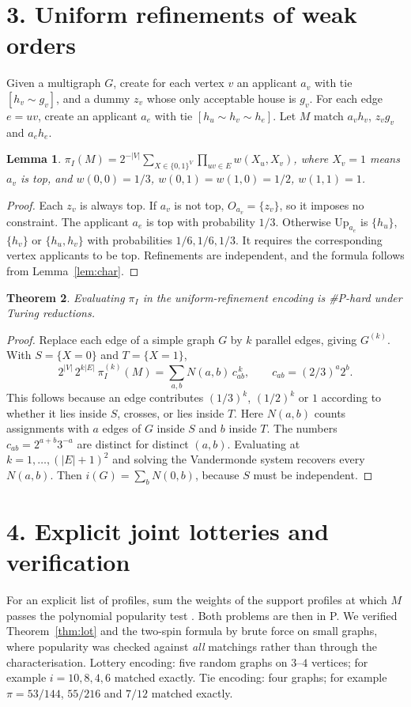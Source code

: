 \documentclass[11pt]{article}
\newtheorem{theorem}{Theorem}
\newtheorem{lemma}[theorem]{Lemma}
\theoremstyle{definition}
\begin{document}
\section*{3. Uniform refinements of weak orders}
Given a multigraph $G$, create for each vertex $v$ an applicant $a_v$ with tie $[h_v\sim g_v]$, and a dummy $z_v$ whose
only acceptable house is $g_v$. For each edge $e=uv$, create an applicant $a_e$ with tie $[h_u\sim h_v\sim h_e]$. Let $M$
match $a_v h_v$, $z_v g_v$ and $a_e h_e$.
\begin{lemma}
$\pi_I(M)=2^{-|V|}\sum_{X\in\{0,1\}^V}\prod_{uv\in E}w(X_u,X_v)$, where $X_v=1$ means $a_v$ is top, and
$w(0,0)=1/3$, $w(0,1)=w(1,0)=1/2$, $w(1,1)=1$.
\end{lemma}
\begin{proof}
Each $z_v$ is always top. If $a_v$ is not top, $O_{a_v}=\{z_v\}$, so it imposes no constraint. The applicant $a_e$ is top
with probability $1/3$. Otherwise $\mathrm{Up}_{a_e}$ is $\{h_u\}$, $\{h_v\}$ or $\{h_u,h_v\}$ with probabilities
$1/6,1/6,1/3$. It requires the corresponding vertex applicants to be top. Refinements are independent, and the formula
follows from Lemma~\ref{lem:char}.
\end{proof}
\begin{theorem}
Evaluating $\pi_I$ in the uniform-refinement encoding is \#P-hard under Turing reductions.
\end{theorem}
\begin{proof}
Replace each edge of a simple graph $G$ by $k$ parallel edges, giving $G^{(k)}$. With $S=\{X=0\}$ and $T=\{X=1\}$,
\[
2^{|V|}\,2^{k|E|}\ \pi_I^{(k)}(M)=\sum_{a,b}N(a,b)\,c_{ab}^{\,k},\qquad c_{ab}=(2/3)^a2^b.
\]
This follows because an edge contributes $(1/3)^k$, $(1/2)^k$ or $1$ according to whether it lies inside $S$, crosses, or lies inside $T$.
Here $N(a,b)$ counts assignments with $a$ edges of $G$ inside $S$ and $b$ inside $T$.
The numbers $c_{ab}=2^{a+b}3^{-a}$ are distinct for distinct $(a,b)$. Evaluating at $k=1,\dots,(|E|+1)^2$ and solving the
Vandermonde system recovers every $N(a,b)$. Then $i(G)=\sum_bN(0,b)$, because $S$ must be independent.
\end{proof}

\section*{4. Explicit joint lotteries and verification}
For an explicit list of profiles, sum the weights of the support profiles at which $M$ passes the polynomial popularity test
\cite{aikm}. Both problems are then in P. We verified Theorem~\ref{thm:lot} and the two-spin formula by brute force on small
graphs, where popularity was checked against \emph{all} matchings rather than through the characterisation. Lottery
encoding: five random graphs on $3$--$4$ vertices; for example $i=10,8,4,6$ matched exactly. Tie encoding: four graphs;
for example $\pi=53/144$, $55/216$ and $7/12$ matched exactly.
\end{document}
